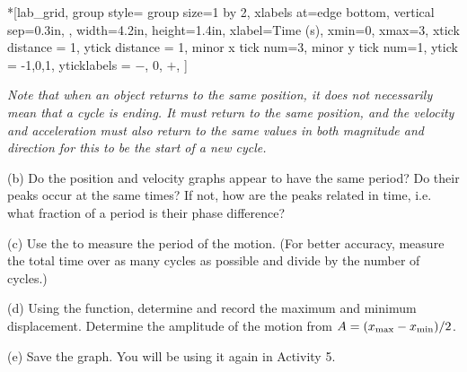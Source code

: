 \begin{lab_groupplot}*{}[lab_grid,
	group style={
		group size=1 by 2,
		xlabels at=edge bottom,
		vertical sep=0.3in,
		},
	width=4.2in,  height=1.4in,
	xlabel=Time (s),
	xmin=0, xmax=3,
	xtick distance = 1, 
	ytick distance = 1, 
	minor x tick num=3,
	minor y tick num=1,
	ytick = {-1,0,1},
	yticklabels = {$-$, 0, $+$},
	]
\nextgroupplot[
	ytick distance = 1, 
	minor y tick num=3,
	ymin=0,ymax=1, 
	ylabel={Position (m/s)},
	]
\nextgroupplot[
	ymin=-1,ymax=1, 
	ylabel={Velocity (m/s)},
	]
\end{lab_groupplot}

\textit{Note that when an object returns to the same position, it 
does not necessarily mean that a cycle is ending. It must return to the same 
position, and the velocity and acceleration must also return to the same 
values in both magnitude and direction for this to be the start of a new cycle.}


(b) Do the position and velocity graphs appear to have the same period? Do their
peaks occur at the same times? If not, how are the peaks related in time, i.e. 
what fraction of a period is their phase difference?
\vspace{20mm}

(c) Use the  to measure the period of the motion. (For
better accuracy, measure the total time over as many cycles as possible and
divide by the number of cycles.)
\vspace{20mm}

(d) Using the  function, determine and record the maximum and minimum 
displacement.  Determine the amplitude of the motion from $A = (x_{\rm max} - x_{\rm min})/2$.
\vspace{20mm}

(e) Save the graph. You will be using it again in Activity 5.

